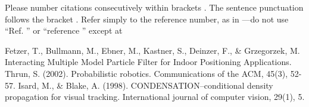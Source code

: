 \documentclass[conference]{IEEEtran}
\begin{document}
Please number citations consecutively within brackets \cite{b1}. The 
sentence punctuation follows the bracket \cite{b2}. Refer simply to the reference 
number, as in \cite{b3}---do not use ``Ref. \cite{b3}'' or ``reference \cite{b3}'' except at 

\begin{thebibliography}{00} %
 Fetzer, T., Bullmann, M., Ebner, M., Kastner, S., Deinzer, F., \& Grzegorzek, M. Interacting Multiple Model Particle Filter for Indoor Positioning Applications.
 Thrun, S. (2002). Probabilistic robotics. Communications of the ACM, 45(3), 52-57. %
 Isard, M., \& Blake, A. (1998). CONDENSATION--conditional density propagation for visual tracking. International journal of computer vision, 29(1), 5.
    
\end{thebibliography}
\end{document}
